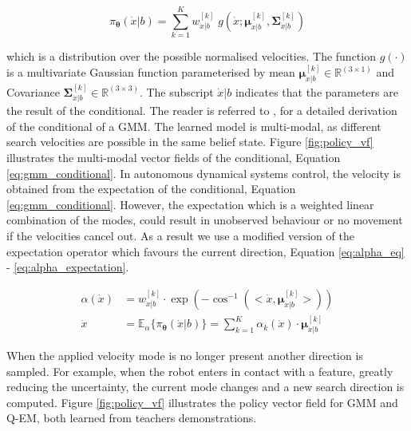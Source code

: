 \documentclass[final,3p,times,twocolumn]{elsarticle}
\newcommand{\SigK}{\boldsymbol{\Sigma}^{[k]}}
\newcommand{\MuK}{\boldsymbol{\mu}^{[k]}}
\newcommand{\xb}{\dot{x}|b}
\newcommand{\Param}{\boldsymbol{\theta}}
\begin{document}
\begin{equation}\label{eq:gmm_conditional}
 \pi_{\Param}(\dot{x}|b) = \sum_{k=1}^{K} w^{[k]}_{\xb} \; g(\dot{x};\MuK_{\xb},\SigK_{\xb}) 
 \end{equation}

which is a distribution over the possible normalised velocities. The function $g(\cdot)$ is a multivariate
Gaussian function parameterised by mean $\MuK_{\xb} \in \mathbb{R}^{(3\times1)}$ and Covariance $\SigK_{\xb} \in \mathbb{R}^{(3\times3)}$. The subscript $\xb$ indicates that the parameters 
are the result of the conditional. The reader is referred to \cite{gesture_calinon_2010}, \cite{gmr_2004} for 
a detailed derivation of the conditional of a GMM. The learned model 
is multi-modal, as different search velocities are possible 
in the same belief state. Figure \ref{fig:policy_vf} illustrates the multi-modal 
vector fields of the conditional, Equation \ref{eq:gmm_conditional}.
In autonomous dynamical systems control, the velocity is obtained from 
the expectation of the conditional, Equation \ref{eq:gmm_conditional}. However, the expectation which is a weighted 
linear combination of the modes, could result in unobserved behaviour or no movement if the velocities cancel out. 
As a result we use a modified version of the expectation operator which favours the current
direction, Equation \ref{eq:alpha_eq} - \ref{eq:alpha_expectation}.

\begin{align}
 \alpha(\dot{x}) &= w^{[k]}_{\xb} \cdot \exp(-\cos^{-1}(<\dot{x},\MuK_{\xb}>)) \label{eq:alpha_eq}\\
 \dot{x} &= \mathbb{E}_{\alpha}\{\pi_{\Param}(\dot{x}|b)\} = \sum_{k=1}^K \alpha_k(\dot{x}) \cdot \MuK_{\xb} \label{eq:alpha_expectation}
\end{align}

When the applied velocity mode is no longer present another direction is sampled. For example, when the robot enters in contact 
with a feature, greatly reducing the uncertainty, the current mode changes and a new search direction is computed. 
Figure \ref{fig:policy_vf} illustrates the policy vector field for GMM and Q-EM, both learned from teachers demonstrations.
\end{document}
